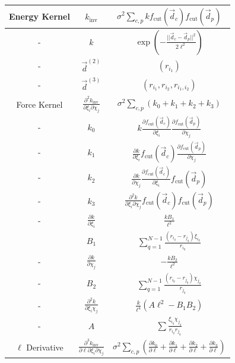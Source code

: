 \documentclass[%
reprint,
superscriptaddress,
amsmath,amssymb,
aps,
prl,
]{revtex4-1}
\begin{document}
\begin{center}
    \begin{table}
    \begin{tabular}{ |c|c|c| } 
     \hline
     Energy Kernel & $k_{\text{inv}}$ & $\sigma^2 \sum_{c, p} k f_{\text{cut}}(\vec{d}_c) f_{\text{cut}}(\vec{d}_p)$ \\ 
     \hline
     - & $k$ & $\exp\left( - \frac{||\vec{d}_c - \vec{d}_p ||^2}{2 \ell^2} \right)$\\
     \hline
     - & $\vec{d}^{(2)}$ & $(r_{i_1})$ \\
     \hline
     - & $\vec{d}^{(3)}$ & $(r_{i_1}, r_{i_2}, r_{i_1, i_2})$ \\
     \hline
    Force Kernel & $\frac{\partial^2 k_{\text{inv}}}{\partial \xi_i \partial \chi_j}$ & $\sigma^2 \sum_{c, p} (k_0 + k_1 + k_2 + k_3)$ \\ 
     \hline
     - & $k_0$ & $k \frac{\partial f_{\text{cut}}(\vec{d}_c)}{\partial \xi_i} \frac{\partial f_{\text{cut}}(\vec{d}_p)}{\partial \chi_j}$ \\ 
     \hline
     - & $k_1$ & $\frac{\partial k}{\partial \xi_i} f_{\text{cut}}(\vec{d}_c) \frac{\partial f_{\text{cut}}(\vec{d}_p)}{\partial \chi_j}$ \\ 
     \hline
     - & $k_2$ & $\frac{\partial k}{\partial \chi_j} \frac{\partial f_{\text{cut}}(\vec{d}_c)}{\partial \xi_i} f_{\text{cut}}(\vec{d}_p)$ \\ 
     \hline
     - & $k_3$ & $\frac{\partial^2 k}{\partial \xi_i \partial \chi_j} f_{\text{cut}}(\vec{d}_c) f_{\text{cut}}(\vec{d}_p)$ \\ 
     \hline
     - & $\frac{\partial k}{\partial \xi_i}$ & $\frac{k B_1}{\ell^2}$ \\ 
     \hline
     & $B_1$ & $\sum_{q=1}^{N-1} \frac{(r_{i_q} - r_{j_q})\xi_{i_q}}{r_{i_q}}$ \\
     \hline
     - & $\frac{\partial k}{\partial \chi_j}$ &  $-\frac{k B_2}{\ell^2}$ \\ 
     \hline
    - & $B_2$ & $\sum_{q=1}^{N-1} \frac{(r_{i_q} - r_{j_q})\chi_{j_q}}{r_{j_q}}$ \\
     \hline
     - & $\frac{\partial^2 k}{\partial \xi_i \chi_j}$ & $\frac{k}{\ell^4} \left(A \ell^2 -B_1 B_2 \right)$\\ 
     \hline
     - & $A$ & $\sum \frac{\xi_{i_q} \chi_{j_q}}{r_{i_q} r_{j_q}}$ \\
     \hline
     $\ell$ Derivative & $\frac{\partial^3 k_{\text{inv}}}{\partial \ell \partial \xi_i \partial \chi_j}$ & $\sigma^2 \sum_{c, p} \left(\frac{\partial k_0}{\partial \ell} + \frac{\partial k_1}{\partial \ell} + \frac{\partial k_2}{\partial \ell} + \frac{\partial k_3}{\partial \ell}\right)$ \\

\end{tabular}
\end{table}
\end{center}
\end{document}
